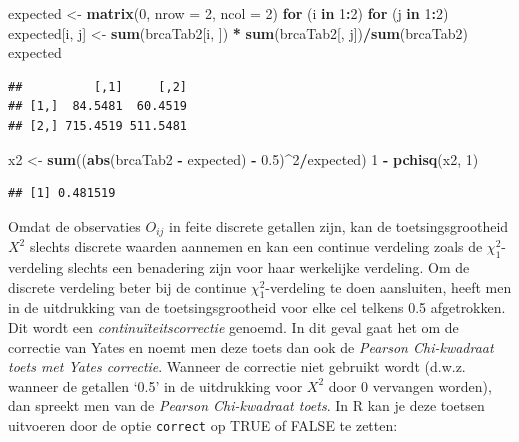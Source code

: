 \documentclass[
  12pt,dutch]{book}
\newenvironment{Shaded}{\begin{snugshade}}{\end{snugshade}}
\newcommand{\AttributeTok}[1]{\textcolor[rgb]{0.13,0.29,0.53}{#1}}
\newcommand{\ControlFlowTok}[1]{\textcolor[rgb]{0.13,0.29,0.53}{\textbf{#1}}}
\newcommand{\DecValTok}[1]{\textcolor[rgb]{0.00,0.00,0.81}{#1}}
\newcommand{\FloatTok}[1]{\textcolor[rgb]{0.00,0.00,0.81}{#1}}
\newcommand{\FunctionTok}[1]{\textcolor[rgb]{0.13,0.29,0.53}{\textbf{#1}}}
\newcommand{\NormalTok}[1]{#1}
\newcommand{\OtherTok}[1]{\textcolor[rgb]{0.56,0.35,0.01}{#1}}
\newcommand{\SpecialCharTok}[1]{\textcolor[rgb]{0.81,0.36,0.00}{\textbf{#1}}}
\theoremstyle{definition}
\theoremstyle{definition}
\theoremstyle{definition}
\theoremstyle{definition}
\theoremstyle{remark}
\begin{document}
\begin{Shaded}
\begin{Highlighting}[]
\NormalTok{expected }\OtherTok{\textless{}{-}} \FunctionTok{matrix}\NormalTok{(}\DecValTok{0}\NormalTok{, }\AttributeTok{nrow =} \DecValTok{2}\NormalTok{, }\AttributeTok{ncol =} \DecValTok{2}\NormalTok{)}
\ControlFlowTok{for}\NormalTok{ (i }\ControlFlowTok{in} \DecValTok{1}\SpecialCharTok{:}\DecValTok{2}\NormalTok{) }\ControlFlowTok{for}\NormalTok{ (j }\ControlFlowTok{in} \DecValTok{1}\SpecialCharTok{:}\DecValTok{2}\NormalTok{) expected[i, j] }\OtherTok{\textless{}{-}} \FunctionTok{sum}\NormalTok{(brcaTab2[i,}
\NormalTok{    ]) }\SpecialCharTok{*} \FunctionTok{sum}\NormalTok{(brcaTab2[, j])}\SpecialCharTok{/}\FunctionTok{sum}\NormalTok{(brcaTab2)}
\NormalTok{expected}
\end{Highlighting}
\end{Shaded}

\begin{verbatim}
##          [,1]     [,2]
## [1,]  84.5481  60.4519
## [2,] 715.4519 511.5481
\end{verbatim}

\begin{Shaded}
\begin{Highlighting}[]
\NormalTok{x2 }\OtherTok{\textless{}{-}} \FunctionTok{sum}\NormalTok{((}\FunctionTok{abs}\NormalTok{(brcaTab2 }\SpecialCharTok{{-}}\NormalTok{ expected) }\SpecialCharTok{{-}} \FloatTok{0.5}\NormalTok{)}\SpecialCharTok{\^{}}\DecValTok{2}\SpecialCharTok{/}\NormalTok{expected)}
\DecValTok{1} \SpecialCharTok{{-}} \FunctionTok{pchisq}\NormalTok{(x2, }\DecValTok{1}\NormalTok{)}
\end{Highlighting}
\end{Shaded}

\begin{verbatim}
## [1] 0.481519
\end{verbatim}

Omdat de observaties \(O_{ij}\) in feite discrete getallen zijn, kan de
toetsingsgrootheid \(X^2\) slechts discrete waarden aannemen en kan een
continue verdeling zoals de \(\chi^2_1\)-verdeling slechts een benadering zijn
voor haar werkelijke verdeling. Om de discrete verdeling beter bij de
continue \(\chi^2_1\)-verdeling te doen aansluiten, heeft men in de
uitdrukking van de toetsingsgrootheid voor elke cel telkens 0.5 afgetrokken. Dit wordt een
\emph{continuïteitscorrectie} genoemd. In dit geval gaat het om de
correctie van Yates en noemt men deze toets dan ook de \emph{Pearson
Chi-kwadraat toets met Yates correctie}. Wanneer de correctie niet gebruikt
wordt (d.w.z. wanneer de getallen `0.5' in de uitdrukking voor \(X^2\) door 0
vervangen worden), dan spreekt men van de \emph{Pearson Chi-kwadraat toets}.
In R kan je deze toetsen uitvoeren door de optie \texttt{correct} op TRUE of FALSE te zetten:
\end{document}
